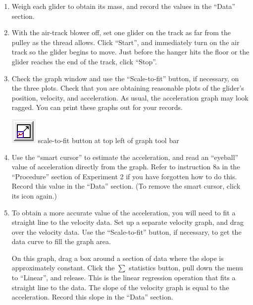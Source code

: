 \begin{enumerate}[label=\arabic*.]

\item Weigh each glider to obtain its mass, and record the values in the ``Data'' section.

\item With the air-track blower off, set one glider on the track as far from the pulley as the thread allows.  Click ``Start'', and immediately turn on the air track so the glider begins to move.  Just before the hanger hits the floor or the glider reaches the end of the track, click ``Stop''.

\item Check the graph window and use the ``Scale-to-fit'' button, if necessary, on the three plots.  Check that you are obtaining reasonable plots of the glider's position, velocity, and acceleration.  As usual, the acceleration graph may look ragged.  You can print these graphs out for your records.

\includegraphics*{imgs/6labs/6Alab/6Aexp3/6A_exp3_ScaleToFit2.png} scale-to-fit button at top left of graph tool bar

\item Use the ``smart cursor'' to estimate the acceleration, and read an ``eyeball'' value of acceleration directly from the graph.  Refer to instruction 8a in the ``Procedure'' section of Experiment 2 if you have forgotten how to do this.  Record this value in the ``Data'' section.  (To remove the smart cursor, click its icon again.)

\item To obtain a more accurate value of the acceleration, you will need to fit a straight line to the velocity data.  Set up a separate velocity graph, and drag over the velocity data.  Use the ``Scale-to-fit'' button, if necessary, to get the data curve to fill the graph area.

On this graph, drag a box around a section of data where the slope is approximately constant.  Click the \(\sum\) statistics button, pull down the menu to ``Linear'', and release.  This is the linear regression operation that fits a straight line to the data.  The slope of the velocity graph is equal to the acceleration.  Record this slope in the ``Data'' section.


\end{enumerate}
